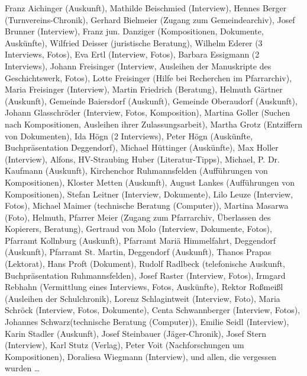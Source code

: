 Franz Aichinger (Auskunft),
Mathilde Beischmied (Interview),
Hennes Berger (Turnvereins-Chronik),
Gerhard Bielmeier (Zugang zum Gemeindearchiv),
Josef Brunner (Interview),
Franz jun. Danziger (Kompositionen, Dokumente, Auskünfte),
Wilfried Deisser (juristische Beratung),
Wilhelm Ederer (3 Interviews, Fotos),
Eva Ertl (Interview, Fotos),
Barbara Essigmann (2 Interviews),
Johann Freisinger (Interview, Ausleihen der Manuskripte des Geschichtswerk, Fotos),
Lotte Freisinger (Hilfe bei Recherchen im Pfarrarchiv),
Maria Freisinger (Interview),
Martin Friedrich (Beratung),
Helmuth Gärtner (Auskunft),
Gemeinde Baiersdorf (Auskunft),
Gemeinde Oberaudorf (Auskunft),
Johann Glasschröder (Interview, Fotos, Komposition),
Martina Goller (Suchen nach Kompositionen, Ausleihen ihrer Zulassungsarbeit),
Martha Grotz (Entziffern von Dokumenten),
Ida Högn (2 Interviews),
Peter Högn (Auskünfte, Buchpräsentation Deggendorf),
Michael Hüttinger (Auskünfte),
Max Holler (Interview),
Alfons, HV-Straubing Huber (Literatur-Tipps),
Michael, P. Dr. Kaufmann (Auskunft),
Kirchenchor Ruhmannsfelden (Aufführungen von Kompositionen),
Kloster Metten (Auskunft),
August Lankes (Aufführungen von Kompositionen),
Stefan Leitner (Interview, Dokumente),
Lilo Leuze (Interview, Fotos),
Michael Maimer (technische Beratung (Computer)),
Martina Masarwa (Foto),
Helmuth, Pfarrer Meier (Zugang zum Pfarrarchiv, Überlassen des Kopierers, Beratung),
Gertraud von Molo (Interview, Dokumente, Fotos),
Pfarramt Kollnburg (Auskunft),
Pfarramt Mariä Himmelfahrt, Deggendorf (Auskunft),
Pfarramt St. Martin, Deggendorf (Auskunft),
Thanos Prapas (Lektorat),
Hans Proft (Dokument),
Rudolf Radlbeck (telefonische Auskunft, Buchpräsentation Ruhmannsfelden),
Josef Raster (Interview, Fotos),
Irmgard Rebhahn (Vermittlung eines Interviews, Fotos, Auskünfte),
Rektor Roßmeißl (Ausleihen der Schulchronik),
Lorenz Schlagintweit (Interview, Foto),
Maria Schröck (Interview, Fotos, Dokumente),
Centa Schwannberger (Interview, Fotos),
Johannes Schwarz(technische Beratung (Computer)),
Emilie Seidl (Interview),
Karin Stadler (Auskunft),
Josef Steinbauer (Jäger-Chronik),
Josef Stern (Interview),
Karl Stutz (Verlag),
Peter Voit (Nachforschungen um Kompositionen),
Doraliesa Wiegmann (Interview),
und allen, die vergessen wurden …